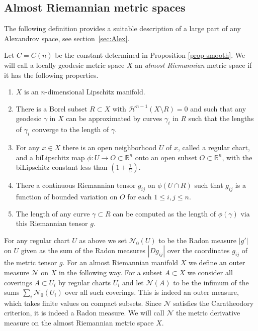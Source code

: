 \documentclass[12pt,leqno]{amsart}
\numberwithin{equation}{section}
\theoremstyle{definition}
\theoremstyle{remark}
\newcommand{\R}{\mathbb{R}}
\begin{document}

\subsection{Almost Riemannian metric spaces}
The following definition provides a suitable description of a  large part of any Alexandrov space, see section~\ref{sec:Alex}.

 Let  $C =C(n)$ be the constant determined in  Proposition \ref{prop-smooth}. We will call  a locally geodesic metric space
 $X$ an \emph{almost Riemannian} metric space  if it has the following properties.
 \begin{enumerate}
 \item  $X$ is an $n$-dimensional Lipschitz manifold.
 \item  There is   a Borel subset $R\subset X$ with $\mathcal H^{n-1} (X\setminus R)=0$ and such that  any geodesic
 $\gamma$ in $X$ can be approximated by curves $\gamma _i$ in $R$ such that the lengths of $\gamma _i$ converge to the length of  $\gamma$.
\item For any  $x\in X$ there is an  open neighborhood $U$ of $x$, called a regular chart, and  a biLipschitz map
$\phi:U\to O\subset \R^n$ onto an open subset $O\subset \R^n$, with the biLipschitz constant less than $(1+\frac 1 C)$.
 \item There a continuous Riemannian tensor $g_{ij} $ on $\phi (U\cap R)$ such that $g_{ij}$ is a  function of bounded variation on $O$
for each $1\leq i,j \leq n$.
 \item The length of any curve $\gamma \subset R$ can be computed as the length of $\phi (\gamma )$ via this Riemannian tensor $g$.
\end{enumerate}

For any regular chart $U$ as above we set $\mathcal N_0 (U)$ to be the Radon measure $|g'|$ on $U$ given as the sum of
the Radon measures $|D g_{ij}|$ over the coordinates $ g_{ij}$ of the metric tensor $g$.
For an almost Riemannian manifold $X$ we define an outer measure $\mathcal N$ on $X$  in the following way.
For a subset $A\subset X$ we consider all  coverings $A\subset U_i$ by regular charts $U_i$ and let $\mathcal N(A)$
to be the infimum of the sums $\sum_i \mathcal N_0 (U_i)$  over all such coverings.  This is indeed an outer measure, which takes finite values on compact subsets.  Since $\mathcal N$  satisfies the Caratheodory criterion, it is indeed a Radon measure.  We will call $\mathcal N$ the metric derivative measure on the almost Riemannian metric space $X$.
\end{document}
